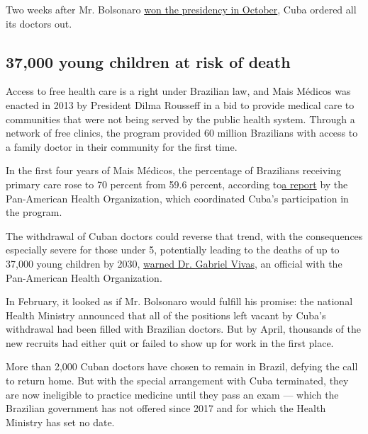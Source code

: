 Two weeks after Mr. Bolsonaro
\href{https://www.nytimes3xbfgragh.onion/2018/10/28/world/americas/jair-bolsonaro-brazil-election.html}{won
the presidency in October}, Cuba ordered all its doctors out.

\hypertarget{37000-young-children-at-risk-of-death}{%
\subsection{37,000 young children at risk of
death}\label{37000-young-children-at-risk-of-death}}

Access to free health care is a right under Brazilian law, and Mais
Médicos was enacted in 2013 by President Dilma Rousseff in a bid to
provide medical care to communities that were not being served by the
public health system. Through a network of free clinics, the program
provided 60 million Brazilians with access to a family doctor in their
community for the first time.

In the first four years of Mais Médicos, the percentage of Brazilians
receiving primary care rose to 70 percent from 59.6 percent, according
to\href{https://www.paho.org/bra/index.php?option=com_content\&view=article\&id=5809:opas-lanca-relatorio-30-anos-de-sus-que-sus-para-2030-e-destaca-importancia-de-atencao-primaria-e-mais-medicos\&Itemid=843}{a
report} by the Pan-American Health Organization, which coordinated
Cuba's participation in the program.

The withdrawal of Cuban doctors could reverse that trend, with the
consequences especially severe for those under 5, potentially leading to
the deaths of up to 37,000 young children by 2030,
\href{https://www.terra.com.br/vida-e-estilo/saude/saida-de-cubanos-pode-levar-a-aumento-de-37-mil-mortes-diz-opas,c9da3a2fd30f623b7f4a90f607913279de24ust3.html}{warned
Dr. Gabriel Vivas}, an official with the Pan-American Health
Organization.

In February, it looked as if Mr. Bolsonaro would fulfill his promise:
the national Health Ministry announced that all of the positions left
vacant by Cuba's withdrawal had been filled with Brazilian doctors. But
by April, thousands of the new recruits had either quit or failed to
show up for work in the first place.

More than 2,000 Cuban doctors have chosen to remain in Brazil, defying
the call to return home. But with the special arrangement with Cuba
terminated, they are now ineligible to practice medicine until they pass
an exam --- which the Brazilian government has not offered since 2017
and for which the Health Ministry has set no date.

